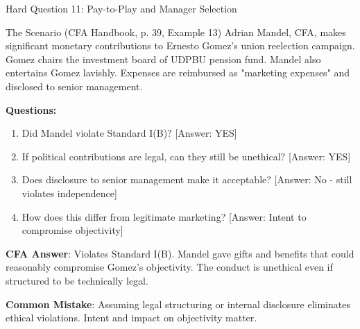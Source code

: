 \documentclass{beamer}
\begin{document}
	\begin{frame}{Hard Question 11: Pay-to-Play and Manager Selection}
		\begin{block}{The Scenario (CFA Handbook, p. 39, Example 13)}
			Adrian Mandel, CFA, makes significant monetary contributions to Ernesto Gomez's union reelection campaign. Gomez chairs the investment board of UDPBU pension fund. Mandel also entertains Gomez lavishly. Expenses are reimbursed as "marketing expenses" and disclosed to senior management.
		\end{block}
		
		\vspace{0.2cm}
		\textbf{Questions:}
		\begin{enumerate}
			\item Did Mandel violate Standard I(B)? \textcolor{cfared}{[Answer: YES]}
			\item If political contributions are legal, can they still be unethical? \textcolor{cfared}{[Answer: YES]}
			\item Does disclosure to senior management make it acceptable? \textcolor{cfared}{[Answer: No - still violates independence]}
			\item How does this differ from legitimate marketing? \textcolor{cfared}{[Answer: Intent to compromise objectivity]}
		\end{enumerate}
		
		\vspace{0.2cm}
		\textcolor{cfablue}{\textbf{CFA Answer}}: Violates Standard I(B). Mandel gave gifts and benefits that could reasonably compromise Gomez's objectivity. The conduct is unethical even if structured to be technically legal.
		
		\vspace{0.1cm}
		\textcolor{cfared}{\textbf{Common Mistake}}: Assuming legal structuring or internal disclosure eliminates ethical violations. Intent and impact on objectivity matter.
	\end{frame}
	
\end{document}
